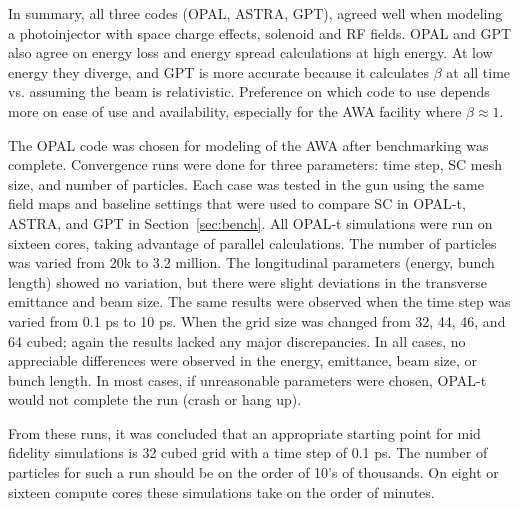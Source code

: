In summary, all three codes (OPAL, ASTRA, GPT), agreed well when modeling a photoinjector
with space charge effects, solenoid and RF fields.
OPAL and GPT also agree on energy loss and energy spread calculations at high energy.
At low energy they diverge, and GPT is more accurate because it calculates 
$\beta$ at all time vs. assuming the beam is relativistic.
Preference on which code to use depends more on ease of use 
and availability, especially for the AWA facility where $\beta\approx 1$. 


The OPAL code was chosen for modeling of the AWA after benchmarking was complete.
Convergence runs were done for three parameters: 
time step, SC mesh size, and number of particles.  
Each case was tested in the gun using the same field maps and 
baseline settings that were used to compare SC in OPAL-t,  
ASTRA, and GPT in Section~\ref{sec:bench}. 
All OPAL-t simulations were run on 
sixteen cores, taking advantage of parallel calculations. 
The number of particles was varied from 20k to 3.2 million.  
The longitudinal parameters (energy,  bunch length)  
showed no variation, but there were slight deviations 
in the transverse emittance and beam size. The same results 
were observed when the time step was varied from 0.1 ps  to  10  ps.  
When the grid size was changed from 32, 44, 46, and 64 cubed; 
again the results lacked any major discrepancies.  
In all cases, no appreciable differences were observed in the energy,
emittance, beam size, or bunch length. In  most  cases,  
if unreasonable  parameters  were chosen, 
OPAL-t would not complete the run (crash or hang up).  

From these runs, it was concluded that an appropriate starting point 
for mid fidelity simulations is 32 cubed grid with a time step
of 0.1 ps. The number of particles for such a run should be on the
order of 10's of thousands. On eight or sixteen compute cores
these simulations take on the order of minutes.


